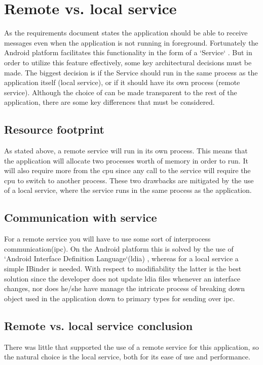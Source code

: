 

\section{Remote vs. local service}

As the requirements document states the application should be able to receive messages even when the application is not running in foreground. Fortunately the Android platform facilitates this functionality in the form of a `Service` \cite{bib:service}. But in order to utilize this feature effectively, some key architectural decisions must be made. The biggest decision is if the Service should run in the same process as the application itself (local service), or if it should have its own process (remote service). Although the choice of can be made transparent to the rest of the application, there are some key differences that must be considered.

\newpage

\subsection{Resource footprint}
As stated above, a remote service will run in its own process. This means that the application will allocate two processes worth of memory in order to run. It will also require more from the \gls{cpu} since any call to the service will require the \gls{cpu} to switch to another process. These two drawbacks are mitigated by the use of a local service, where the service runs in the same process as the application. 

\subsection{Communication with service}
For a remote service you will have to use some sort of  interprocess communication(\gls{ipc}). On the Android platform this is solved by the use of `Android Interface Definition Language`(\gls{ldia}) \cite{bib:aidl}, whereas for a local service a simple IBinder \cite{bib:ibinder} is needed. With respect to modifiability the latter is the best solution since the developer does not update \gls{ldia} files whenever an interface changes, nor does he/she have manage the intricate process of breaking down object used in the application down to primary types for sending over \gls{ipc}.

\subsection{Remote vs. local service conclusion}
There was little that supported the use of a remote service for this application, so the natural choice is the local service, both for its ease of use and performance.




